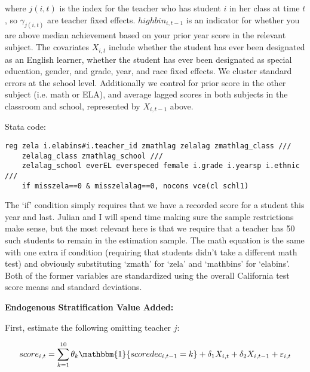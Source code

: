 \documentclass[letterpaper,12pt]{article}
\begin{document}
\noindent where $j(i, t)$ is the index for the teacher who has student $i$ in her class at time $t$, so $\gamma_{j(i, t)}$ are teacher fixed effects. $highbin_{i,t-1}$ is an indicator for whether you are above median achievement based on your prior year score in the relevant subject. The covariates $X_{i, t}$ include whether the student has ever been designated as an English learner, whether the student has ever been designated as special education, gender, and grade, year, and race fixed effects. We cluster standard errors at the school level. Additionally we control for prior score in the other subject (i.e. math or ELA), and average lagged scores in both subjects in the classroom and school, represented by $X_{i, t-1}$ above.

\vspace{.5cm}

\noindent Stata code:

\begin{verbatim}
reg zela i.elabins#i.teacher_id zmathlag zelalag zmathlag_class ///
    zelalag_class zmathlag_school ///
    zelalag_school everEL everspeced female i.grade i.yearsp i.ethnic ///
    if misszela==0 & misszelalag==0, nocons vce(cl schl1)
\end{verbatim}

\noindent The `if' condition simply requires that we have a recorded score for a student this year and last. Julian and I will spend time making sure the sample restrictions make sense, but the most relevant here is that we require that a teacher has 50 such students to remain in the estimation sample. The math equation is the same with one extra if condition (requiring that students didn't take a different math test) and obviously substituting `zmath' for `zela' and `mathbins' for `elabins'. Both of the former variables are standardized using the overall California test score means and standard deviations.

\vspace{1cm}



\noindent \textbf{Endogenous Stratification Value Added:}

\noindent First, estimate the following omitting teacher $j$:

    \begin{align*}
        score_{i,t} = \sum_{k=1}^{10} \theta_k \mathbbm{1}\{scoredec_{i, t-1} = k\} + \delta_1 X_{i, t} + \delta_2 X_{i, t-1} + \varepsilon_{i, t}
    \end{align*}
    
\end{document}
